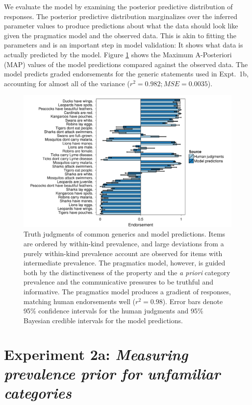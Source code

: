\documentclass[10pt,letterpaper]{article}
\begin{document}
We evaluate the model by examining the posterior predictive distribution of responses. 
The posterior predictive distribution marginalizes over the inferred parameter values to produce predictions about what the data should look like given the pragmatics model and the observed data. 
This is akin to fitting the parameters and is an important step in model validation: It shows what data is actually predicted by the model. 
Figure \ref{fig:tj1b} shows the Maximum A-Posteriori (MAP) values of the model predictions compared against the observed data. 
The model predicts graded endorsements for the generic statements used in Expt.~1b, accounting for almost all of the variance ($r^2 = 0.982; MSE=0.0035 $). 

\begin{figure}
\centering
    \includegraphics[width=\columnwidth]{tj_n100-postPred-byItem.pdf}
    \caption{Truth judgments of common generics and model predictions. 
Items are ordered by within-kind prevalence, and large deviations from a purely within-kind prevalence account are observed for items with intermediate prevalence. 
The pragmatics model, however, is guided both by the distinctiveness of the property and the \emph{a priori} category prevalence and the communicative pressures to be truthful and informative.
The pragmatics model produces a gradient of responses, matching human endorsements well ($r^2 = 0.98$).
Error bars denote 95\% confidence intervals for the human judgments and 95\% Bayesian credible intervals for the model predictions.}
  \label{fig:tj1b}
\end{figure}


\section{Experiment 2a: \emph{Measuring prevalence prior for unfamiliar categories}}
\label{sec:prior2}
\end{document}

